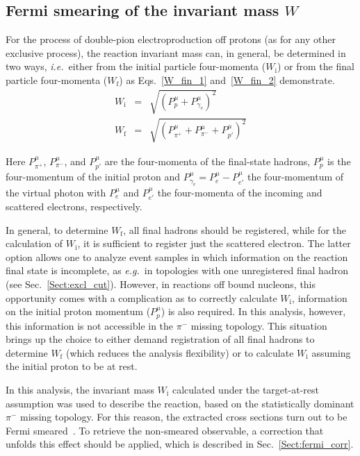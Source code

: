 \documentclass[prc,twocolumn,superscriptaddress,showpacs,amssymb,amsmath,amsfonts,aps,nofootinbib]{revtex4-1}
\begin{document}
\subsection{Fermi smearing of the invariant mass $W$}
\label{Sect:smearing_blurring}


For the process of double-pion electroproduction off protons (as for any other exclusive process), the reaction invariant mass can, in general, be determined in two ways, {\it i.e.}~either from the initial particle  four-momenta ($W_{\text{i}}$) or from the final particle  four-momenta ($W_{\text{f}}$) as Eqs.\!~\eqref{W_fin_1} and~\eqref{W_fin_2} demonstrate. 
\begin{eqnarray}
W_{\text{i}}&= & \sqrt{(P_{p}^{\mu}+P_{\gamma_{v}}^{\mu})^{2}} \label{W_fin_1} \\
W_{\text{f}}&= & \sqrt{(P_{\pi^{+}}^{\mu}+P_{\pi^{-}}^{\mu}+P_{p'}^{\mu})^{2}} \label{W_fin_2}
\end{eqnarray}

Here $P_{\pi^{+}}^{\mu}$, $P_{\pi^{-}}^{\mu}$, and $P_{p'}^{\mu}$ are the four-momenta of the final-state hadrons, $P_{p}^{\mu}$ is the four-momentum of the initial proton and $P_{\gamma_{v}}^{\mu}=P_{e}^{\mu}-P_{e'}^{\mu}$ the four-momentum of the virtual photon with $P_{e}^{\mu}$ and $P_{e'}^{\mu}$ the four-momenta of the incoming and scattered electrons, respectively. 

In general, to determine $W_{\text{f}}$, all final hadrons should be registered, while for the calculation of $W_{\text{i}}$, it is sufficient to register just the scattered electron. The latter option allows one to analyze event samples in which information on the reaction final state is incomplete, as {\it e.g.}~in topologies with one unregistered final hadron (see Sec.\!~\ref{Sect:excl_cut}). However, in reactions off bound nucleons, this opportunity comes with a complication as to correctly calculate $W_{\text{i}}$, information on the initial proton momentum ($P_{p}^{\mu}$) is also required. In this analysis, however, this information is not accessible in the $\pi^{-}$ missing topology. This situation brings up the choice to either demand registration of all final hadrons to determine $W_{\text{f}}$ (which reduces the analysis flexibility) or to calculate $W_{\text{i}}$ assuming the initial proton to be at rest.  


In this analysis, the invariant mass $W_{\text{i}}$ calculated under the target-at-rest assumption was used to describe the reaction, based on the statistically dominant $\pi^{-}$ missing topology. For this reason, the extracted cross sections turn out to be Fermi smeared~\cite{Skorodumina:2015rea,twopeg-d}. To retrieve the non-smeared observable, a correction that unfolds this effect should be applied, which is described in Sec.\!~\ref{Sect:fermi_corr}.
\end{document}
